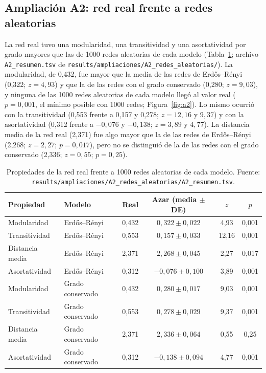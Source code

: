 \subsection{Ampliación A2: red real frente a redes aleatorias}
La red real tuvo una modularidad, una transitividad y una asortatividad por grado mayores que las de 1000 redes aleatorias de cada modelo (Tabla~\ref{tab:a2}; archivo \texttt{A2\_resumen.tsv} de \texttt{results/ampliaciones/A2\_redes\_aleatorias/}). La modularidad, de 0,432, fue mayor que la media de las redes de Erd\H{o}s--R\'enyi (0,322; $z = 4{,}93$) y que la de las redes con el grado conservado (0,280; $z = 9{,}03$), y ninguna de las 1000 redes aleatorias de cada modelo llegó al valor real ($p = 0{,}001$, el mínimo posible con 1000 redes; Figura~\ref{fig:a2}). Lo mismo ocurrió con la transitividad (0,553 frente a 0,157 y 0,278; $z = 12{,}16$ y $9{,}37$) y con la asortatividad (0,312 frente a $-0{,}076$ y $-0{,}138$; $z = 3{,}89$ y $4{,}77$). La distancia media de la red real (2,371) fue algo mayor que la de las redes de Erd\H{o}s--R\'enyi (2,268; $z = 2{,}27$; $p = 0{,}017$), pero no se distinguió de la de las redes con el grado conservado (2,336; $z = 0{,}55$; $p = 0{,}25$).

\begin{table}[h!]
	\renewcommand{\arraystretch}{1.25}
	\caption{Propiedades de la red real frente a 1000 redes aleatorias de cada modelo. Fuente: \texttt{results/ampliaciones/A2\_redes\_aleatorias/A2\_resumen.tsv}.}
	\label{tab:a2}
	\begin{tabular}{llcccc}
		\hline
		Propiedad & Modelo & Real & Azar (media $\pm$ DE) & $z$ & $p$ \tabularnewline
		\hline
		Modularidad & Erd\H{o}s--R\'enyi & 0,432 & $0{,}322 \pm 0{,}022$ & 4,93 & 0,001 \tabularnewline
		Transitividad & Erd\H{o}s--R\'enyi & 0,553 & $0{,}157 \pm 0{,}033$ & 12,16 & 0,001 \tabularnewline
		Distancia media & Erd\H{o}s--R\'enyi & 2,371 & $2{,}268 \pm 0{,}045$ & 2,27 & 0,017 \tabularnewline
		Asortatividad & Erd\H{o}s--R\'enyi & 0,312 & $-0{,}076 \pm 0{,}100$ & 3,89 & 0,001 \tabularnewline
		Modularidad & Grado conservado & 0,432 & $0{,}280 \pm 0{,}017$ & 9,03 & 0,001 \tabularnewline
		Transitividad & Grado conservado & 0,553 & $0{,}278 \pm 0{,}029$ & 9,37 & 0,001 \tabularnewline
		Distancia media & Grado conservado & 2,371 & $2{,}336 \pm 0{,}064$ & 0,55 & 0,25 \tabularnewline
		Asortatividad & Grado conservado & 0,312 & $-0{,}138 \pm 0{,}094$ & 4,77 & 0,001 \tabularnewline
		\hline
	\end{tabular}
\end{table}

